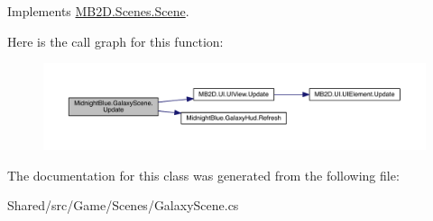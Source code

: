 Implements \hyperlink{class_m_b2_d_1_1_scenes_1_1_scene_a779de7c1ab23b698dcde3a228324a991}{M\+B2\+D.\+Scenes.\+Scene}.

Here is the call graph for this function\+:
\nopagebreak
\begin{figure}[H]
\begin{center}
\leavevmode
\includegraphics[width=350pt]{class_midnight_blue_1_1_galaxy_scene_a9dfa66406143ed20f4d534c768f05a78_cgraph}
\end{center}
\end{figure}


The documentation for this class was generated from the following file\+:\begin{DoxyCompactItemize}
\item 
Shared/src/\+Game/\+Scenes/Galaxy\+Scene.\+cs\end{DoxyCompactItemize}
